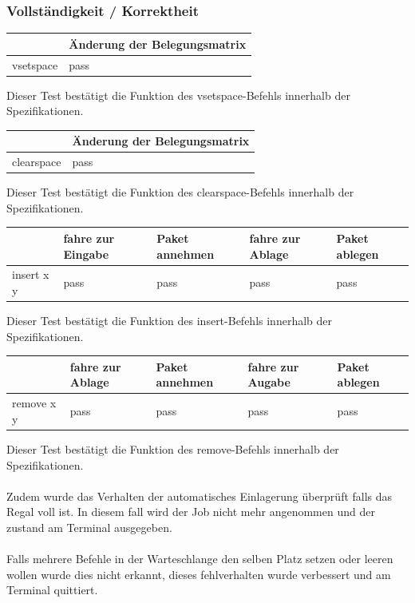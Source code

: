 \subsubsection {Vollständigkeit / Korrektheit} 

\begin{tabular}{|l|l|}
\hline
         	& Änderung der Belegungsmatrix\\
\hline
vsetspace & pass\\
\hline
\end{tabular}

Dieser Test bestätigt die Funktion des vsetspace-Befehls innerhalb der Spezifikationen.

\begin{tabular}{|l|l|}
\hline
         	& Änderung der Belegungsmatrix\\
\hline
clearspace & pass\\
\hline
\end{tabular}

Dieser Test bestätigt die Funktion des clearspace-Befehls innerhalb der Spezifikationen.


\begin{tabular}{|l|l|l|l|l|}
\hline
         	&  fahre zur Eingabe & Paket annehmen   & fahre zur Ablage & Paket ablegen\\
\hline
insert x y & pass & pass & pass & pass\\
\hline
\end{tabular}

Dieser Test bestätigt die Funktion des insert-Befehls innerhalb der Spezifikationen.

\begin{tabular}{|l|l|l|l|l|}
\hline
         	&  fahre zur Ablage & Paket annehmen   & fahre zur Augabe & Paket ablegen\\
\hline
remove x y & pass & pass & pass & pass\\
\hline
\end{tabular}

Dieser Test bestätigt die Funktion des remove-Befehls innerhalb der Spezifikationen.\\
\\
Zudem wurde das Verhalten der automatisches Einlagerung überprüft falls das Regal voll ist. In diesem fall wird der Job nicht mehr angenommen und der zustand am Terminal ausgegeben.\\
\\
Falls mehrere Befehle in der Warteschlange den selben Platz setzen oder leeren wollen wurde dies nicht erkannt, dieses fehlverhalten wurde verbessert  und am Terminal quittiert.


